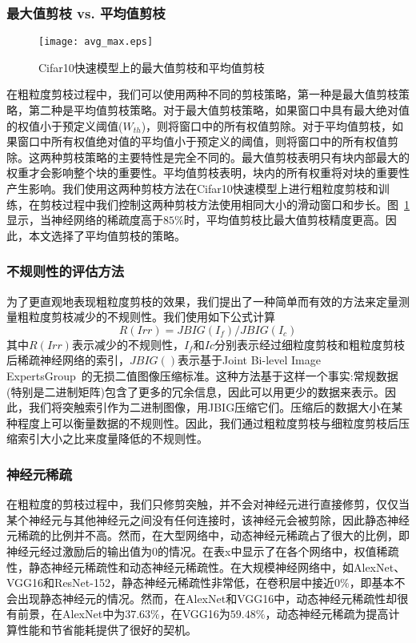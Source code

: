 \subsubsection{最大值剪枝 vs. 平均值剪枝}

\begin{figure}[t]
  \centering
  \texttt{[image: avg\_max.eps]}
  \caption{Cifar10快速模型上的最大值剪枝和平均值剪枝}
  \label{fig:max_or_avg_pruning}
\end{figure}

在粗粒度剪枝过程中，我们可以使用两种不同的剪枝策略，第一种是最大值剪枝策略，第二种是平均值剪枝策略。对于最大值剪枝策略，如果窗口中具有最大绝对值的权值小于预定义阈值($W_{th}$)，则将窗口中的所有权值剪除。对于平均值剪枝，如果窗口中所有权值绝对值的平均值小于预定义的阈值，则将窗口中的所有权值剪除。这两种剪枝策略的主要特性是完全不同的。最大值剪枝表明只有块内部最大的权重才会影响整个块的重要性。平均值剪枝表明，块内的所有权重将对块的重要性产生影响。我们使用这两种剪枝方法在Cifar10快速模型上进行粗粒度剪枝和训练，在剪枝过程中我们控制这两种剪枝方法使用相同大小的滑动窗口和步长。图~\ref{fig:max_or_avg_pruning}显示，当神经网络的稀疏度高于$85\%$时，平均值剪枝比最大值剪枝精度更高。因此，本文选择了平均值剪枝的策略。

\subsubsection{不规则性的评估方法}
为了更直观地表现粗粒度剪枝的效果，我们提出了一种简单而有效的方法来定量测量粗粒度剪枝减少的不规则性。我们使用如下公式计算
\begin{equation}
R(Irr) = JBIG(I_f)/JBIG(I_c)
\end{equation}
其中$R(Irr)$表示减少的不规则性，$I_{f}$和$I {c}$分别表示经过细粒度剪枝和粗粒度剪枝后稀疏神经网络的索引，$JBIG()$表示基于Joint Bi-level Image ExpertsGroup~\cite{jbig}的无损二值图像压缩标准。这种方法基于这样一个事实:常规数据(特别是二进制矩阵)包含了更多的冗余信息，因此可以用更少的数据来表示。因此，我们将突触索引作为二进制图像，用JBIG压缩它们。压缩后的数据大小在某种程度上可以衡量数据的不规则性。因此，我们通过粗粒度剪枝与细粒度剪枝后压缩索引大小之比来度量降低的不规则性。

\subsubsection{神经元稀疏}
在粗粒度的剪枝过程中，我们只修剪突触，并不会对神经元进行直接修剪，仅仅当某个神经元与其他神经元之间没有任何连接时，该神经元会被剪除，因此静态神经元稀疏的比例并不高。然而，在大型网络中，动态神经元稀疏占了很大的比例，即神经元经过激励后的输出值为0的情况。在表x中显示了在各个网络中，权值稀疏性，静态神经元稀疏性和动态神经元稀疏性。在大规模神经网络中，如AlexNet、VGG16和ResNet-152，静态神经元稀疏性非常低，在卷积层中接近$0\%$，即基本不会出现静态神经元的情况。然而，在AlexNet和VGG16中，动态神经元稀疏性却很有前景，在AlexNet中为$37.63\%$，在VGG16为$59.48\%$，动态神经元稀疏为提高计算性能和节省能耗提供了很好的契机。

